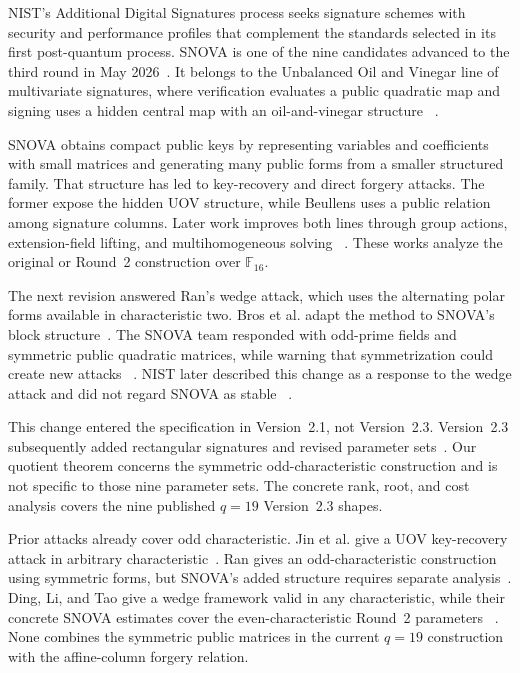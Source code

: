 \documentclass[11pt]{article}
\newcommand{\F}{\mathbb F}
\newcommand{\SNOVA}{\textsf{SNOVA}}
\begin{document}
NIST's Additional Digital Signatures process seeks signature schemes with
security and performance profiles that complement the standards selected in
its first post-quantum process.  \SNOVA{} is one of the nine candidates
advanced to the third round in May 2026~\cite{NISTRound3,NISTIR8610}.  It
belongs to the Unbalanced Oil and Vinegar line of multivariate signatures,
where verification evaluates a public quadratic map and signing uses a
hidden central map with an oil-and-vinegar structure
~\cite{KipnisPatarinGoubin1999,SNOVA23}.

\SNOVA{} obtains compact public keys by representing variables and
coefficients with small matrices and generating many public forms from a
smaller structured family.  That structure has led to key-recovery and direct
forgery attacks.  The former expose the hidden UOV structure, while Beullens
uses a public relation among signature columns.  Later work improves both
lines through group actions, extension-field lifting, and
multihomogeneous solving
~\cite{IkematsuAkiyama2024,LiDing2024,Beullens2024SNOVA,Cabarcas2025SNOVA,FurueEtAl2025,NakamuraEtAl2025}.
These works analyze the original or Round~2 construction over $\F_{16}$.

The next revision answered Ran's wedge attack, which uses the alternating
polar forms available in characteristic two.  Bros et al. adapt the method to
SNOVA's block structure~\cite{Ran2026,BrosEtAl2026SNOVAWedge}.  The \SNOVA{}
team responded with odd-prime fields and symmetric public quadratic matrices,
while warning that symmetrization could create new attacks
~\cite{WangEtAl2025Round2Security}.  NIST later described this change as a
response to the wedge attack and did not regard \SNOVA{} as stable
~\cite{NISTIR8610}.

This change entered the specification in Version~2.1, not Version~2.3.
Version~2.3 subsequently added rectangular signatures and revised parameter
sets~\cite{SNOVA23}.  Our quotient theorem concerns the symmetric
odd-characteristic construction and is not specific to those nine parameter
sets.  The concrete rank, root, and cost analysis covers the nine published
$q=19$ Version~2.3 shapes.

Prior attacks already cover odd characteristic.  Jin et al. give a UOV
key-recovery attack in arbitrary characteristic~\cite{JinEtAl2026}.  Ran gives
an odd-characteristic construction using symmetric forms, but SNOVA's added
structure requires separate analysis~\cite{Ran2026}.  Ding, Li, and Tao give a
wedge framework valid in any characteristic, while their concrete SNOVA
estimates cover the even-characteristic Round~2 parameters
~\cite{DingLiTao2026}.  None combines the symmetric public matrices in the
current $q=19$ construction with the affine-column forgery relation.
\end{document}

